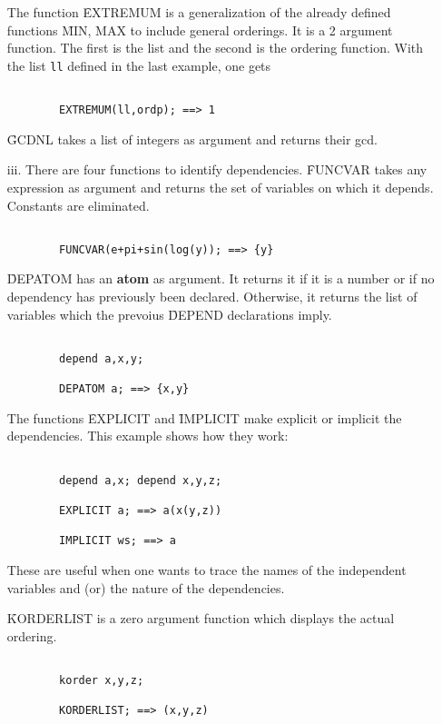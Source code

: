 \begin{itemize}
The function \f{EXTREMUM} is a generalization of the already defined functions
\f{MIN, MAX} to include general orderings. It is a 2 argument function.
The first is the list and the second is the ordering function.
With the list \verb+ll+ defined in the last example, one gets
\begin{verbatim}

        EXTREMUM(ll,ordp); ==> 1

\end{verbatim}

\f{GCDNL} takes a list of integers as argument and returns their gcd.  
\item[iii.] There are four functions to identify dependencies.
\f{FUNCVAR} takes any expression as argument and returns the set of
variables on which it depends. Constants are  eliminated.
\begin{verbatim}

        FUNCVAR(e+pi+sin(log(y)); ==> {y}

\end{verbatim}
\f{DEPATOM} has an {\bf atom} as argument. It returns it if it is
a number or if no dependency has previously been declared. Otherwise,
it returns the list of variables which the prevoius \f{DEPEND} declarations
imply.
\begin{verbatim}

        depend a,x,y;

        DEPATOM a; ==> {x,y}

\end{verbatim}
The functions \f{EXPLICIT} and \f{IMPLICIT} make explicit or
implicit the dependencies. This example shows how they work:
\begin{verbatim}

        depend a,x; depend x,y,z;

        EXPLICIT a; ==> a(x(y,z))

        IMPLICIT ws; ==> a

\end{verbatim}
These are useful when one wants to trace the names of the independent 
variables
and (or) the nature of the dependencies.

\f{KORDERLIST} is a zero argument function which displays the actual
ordering.
\begin{verbatim}

        korder x,y,z;

        KORDERLIST; ==> (x,y,z)

\end{verbatim}


\end{itemize}
